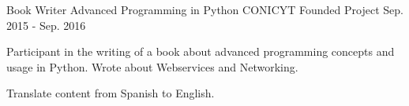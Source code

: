 \begin{cventries}
  \cventry
    {Book Writer}
    {Advanced Programming in Python}
    {CONICYT Founded Project}
    {Sep. 2015 - Sep. 2016}
    {
      \begin{cvitems}
        \item {Participant in the writing of a book about advanced programming concepts and usage in Python. Wrote about Webservices and Networking.}
        \item {Translate content from Spanish to English.}
      \end{cvitems}
    }
\end{cventries}
